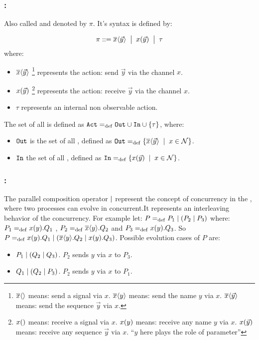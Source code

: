 \subsubsection{:} Also called  and denoted by $\pi$. It's syntax is defined by:
\begin{definition}
\label{def_prefix_syntax}
\begin{align*}
 \pi ::= \overline{x}\langle\vec{y}\rangle \;\bigm|\; x(\vec{y}) \;\bigm|\; \tau
\end{align*}
where:
\begin{itemize}
\item $\overline{x}\langle\vec{y}\rangle$ \footnote{$\overline{x}\langle{}\rangle$ means: send a signal via $x$. $\overline{x}\langle{y}\rangle$ means: send the name $y$ via $x$.  $\overline{x}\langle{\vec{y}}\rangle$ means: send the sequence $\vec{y}$ via $x$.} represents the action: send $\vec{y}$ via the channel $x$.
\item $x(\vec{y})$ \footnote{$x({})$ means: receive a signal via $x$. $x({y})$ means: receive any name $y$ via $x$.  $x({\vec{y}})$ means: receive any sequence $\vec{y}$ via $x$. ``$y$ here plays the role of parameter''} represents the action: receive $\vec{y}$ via the channel $x$.
\item $\tau$ represents an internal non observable action.
\end{itemize}
\end{definition}
The set of all  is defined as $\actions\define\outA\cup\inA\cup\set{\tau}$, where:
\begin{itemize}
\item $\mathtt{Out}$ is the set of all , defined as $\outA\define\set[x\in\names]{\out{x}{\vec{y}}}$.
\item $\mathtt{In}$ the set of all , defined as $\inA\define\set[x\in\names]{\inp{x}{\vec{y}}}$.
\end{itemize}
\subsubsection{:}
The parallel composition operator $\mid$ represent the concept of concurrency in the \picalc{}, where two processes can evolve in concurrent.It represents an interleaving behavior of the concurrency.
For example let:  $P=_{\mathrm{def}}P_1 \mid (P_2 \mid P_3)$ where: $P_1=_{\mathrm{def}}x(y).Q_1$ , $P_2=_{\mathrm{def}}\overline{x}\langle y\rangle.Q_2$ and $P_3=_{\mathrm{def}}x(y).Q_3$. So $P=_{\mathrm{def}}x(y).Q_1 \mid (\overline{x}\langle y\rangle.Q_2 \mid x(y).Q_3)$.
Possible evolution cases of $P$ are:
\begin{itemize}
\item $P_1 \mid (Q_2 \mid Q_3)$. $P_2$ sends $y$ via $x$ to $P_3$.
\item $Q_1 \mid (Q_2 \mid P_3)$. $P_2$ sends $y$ via $x$ to $P_1$.
\end{itemize}


